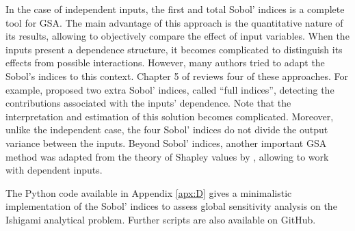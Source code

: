 In the case of independent inputs, the first and total Sobol' indices is a complete tool for GSA. 
The main advantage of this approach is the quantitative nature of its results, allowing to objectively compare the effect of input variables. 
When the inputs present a dependence structure, it becomes complicated to distinguish its effects from possible interactions. 
However, many authors tried to adapt the Sobol's indices to this context. 
Chapter 5 of \citet{daveiga_iooss_2021} reviews four of these approaches. 
For example, \citet{mara_tarantola_2012} proposed two extra Sobol' indices, called ``full indices'', detecting the contributions associated with the inputs' dependence. 
Note that the interpretation and estimation of this solution becomes complicated. 
Moreover, unlike the independent case, the four Sobol' indices do not divide the output variance between the inputs. 
Beyond Sobol' indices, another important GSA method was adapted from the theory of Shapley values by \citet{owen_2014_shapley}, allowing to work with dependent inputs.   

\begin{otexample}
    The Python code available in Appendix \ref{apx:D} gives a minimalistic \ot implementation of the Sobol' indices to assess global sensitivity analysis on the Ishigami analytical problem.
    Further scripts are also available on GitHub\footnotemark.  
\end{otexample}

